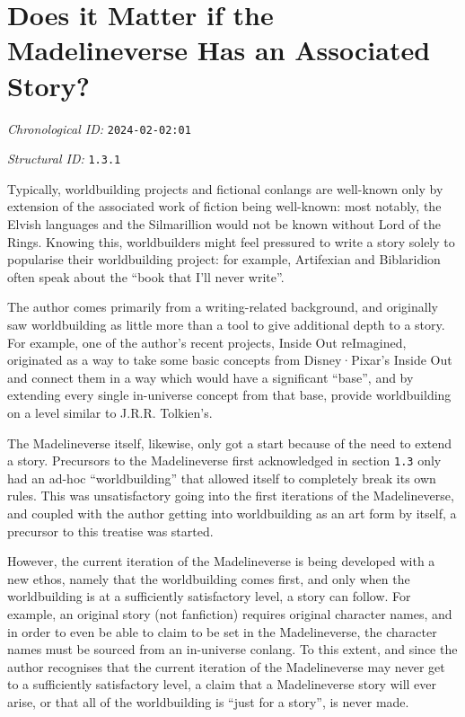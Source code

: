 \section{Does it Matter if the Madelineverse Has an Associated Story?}
\emph{Chronological ID:} \texttt{2024-02-02:01}

\emph{Structural ID:} \texttt{1.3.1}

Typically, worldbuilding projects and fictional conlangs are well-known only by extension of the associated work of fiction being well-known: most notably, the Elvish languages and the Silmarillion would not be known without Lord of the Rings. Knowing this, worldbuilders might feel pressured to write a story solely to popularise their worldbuilding project: for example, Artifexian and Biblaridion often speak about the ``book that I'll never write''.

The author comes primarily from a writing-related background, and originally saw worldbuilding as little more than a tool to give additional depth to a story. For example, one of the author's recent projects, Inside Out reImagined, originated as a way to take some basic concepts from Disney·Pixar's Inside Out and connect them in a way which would have a significant ``base'', and by extending every single in-universe concept from that base, provide worldbuilding on a level similar to J.R.R. Tolkien's.

The Madelineverse itself, likewise, only got a start because of the need to extend a story. Precursors to the Madelineverse first acknowledged in section \texttt{1.3} only had an ad-hoc ``worldbuilding'' that allowed itself to completely break its own rules. This was unsatisfactory going into the first iterations of the Madelineverse, and coupled with the author getting into worldbuilding as an art form by itself, a precursor to this treatise was started.

However, the current iteration of the Madelineverse is being developed with a new ethos, namely that the worldbuilding comes first, and only when the worldbuilding is at a sufficiently satisfactory level, a story can follow. For example, an original story (not fanfiction) requires original character names, and in order to even be able to claim to be set in the Madelineverse, the character names must be sourced from an in-universe conlang. To this extent, and since the author recognises that the current iteration of the Madelineverse may never get to a sufficiently satisfactory level, a claim that a Madelineverse story will ever arise, or that all of the worldbuilding is ``just for a story'', is never made.
\newpage
